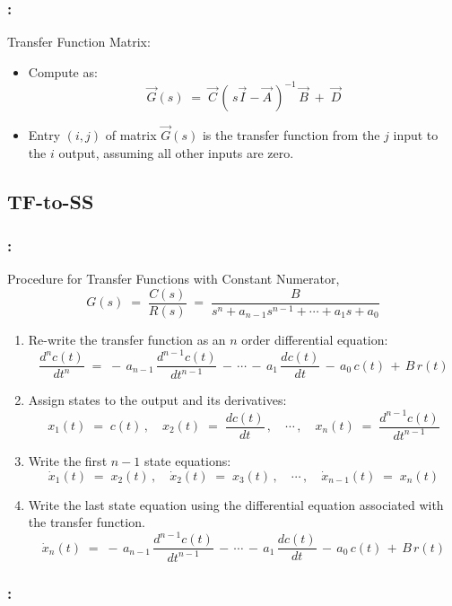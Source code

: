 \documentclass[ 10pt, xcolor = dvipsnames]{beamer}
\begin{document}
\begin{frame}[allowframebreaks]
\frametitle{\insertsection: \insertsubsection}

Transfer Function Matrix: 
\begin{itemize}
\item Compute as: 
\[
\vec{G}(s) \; = \;
\vec{C} \, ( \, s \vec{I} - \vec{A} \, )^{-1} \, \vec{B}
\; + \; \vec{D}
\]
\item Entry $(i,j)$ of matrix $\vec{G}(s)$ is the transfer function from the $j$ input to the $i$ output, assuming all other inputs are zero. 
\end{itemize}

\end{frame}

\subsection{TF-to-SS}

\begin{frame}[allowframebreaks]
\frametitle{\insertsection: \insertsubsection}

Procedure for Transfer Functions with Constant Numerator, \iec
\[
G(s) \; = \; \frac{C(s)}{R(s)} \; = \; 
\frac{B}{s^n + a_{n-1} s^{n-1} + \cdots + a_1 s + a_0}
\]

\begin{enumerate}
\item Re-write the transfer function as an $n$ order differential equation: 
\[
\frac{d^n c(t)}{dt^n} \; = \;
- \, a_{n-1} \, \frac{d^{n-1} c(t)}{dt^{n-1}}
\, - \, \cdots
\, - \, a_1 \, \frac{dc(t)}{dt} \, - \, a_0 \, c(t)
\, + \, B \, r(t)
\]
\item Assign states to the output and its derivatives: 
\[
x_1(t) \; = \; c(t) \, , \quad
x_2(t) \; = \; \frac{dc(t)}{dt} \, , \quad
\cdots \, , \quad
x_n(t) \; = \; \frac{d^{n-1} c(t)}{dt^{n-1}}
\]
\framebreak

\item Write the first $n-1$ state equations: 
\[
\dot{x}_1(t) \; = \; x_2(t) \, , \quad
\dot{x}_2(t) \; = \; x_3(t) \, , \quad
\cdots \, , \quad
\dot{x}_{n-1}(t) \; = \; x_n(t)
\]
\item Write the last state equation using the differential equation associated with the transfer function. 
\[
\dot{x}_{n}(t) \; = \;
- \, a_{n-1} \, \frac{d^{n-1} c(t)}{dt^{n-1}}
\, - \, \cdots
\, - \, a_1 \, \frac{dc(t)}{dt} \, - \, a_0 \, c(t)
\, + \, B \, r(t)
\]

\end{enumerate}

\end{frame}

\begin{frame}[allowframebreaks]
\frametitle{\insertsection: \insertsubsection}

\end{frame}
\end{document}
